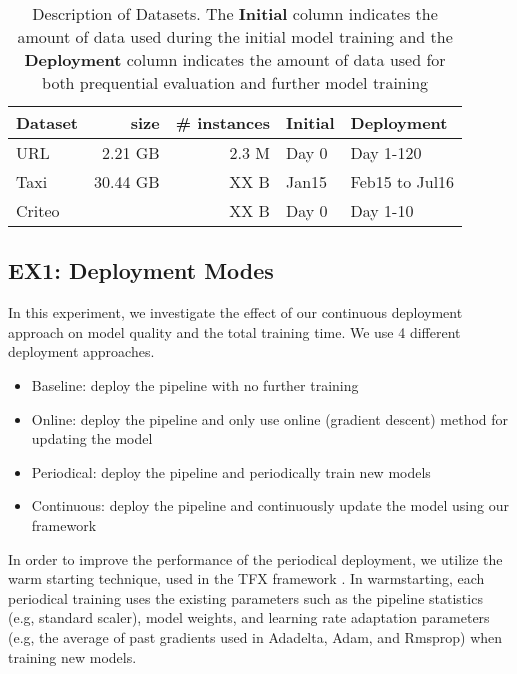 \begin{table}[h!]
\centering
\begin{tabular}{lrrll}
\hline
\textbf{Dataset}  & \textbf{size} &\textbf{\# instances} & \textbf{Initial} & \textbf{Deployment} \\
\hline
URL        &  2.21 GB & 2.3 M           & Day 0        & Day 1-120          \\
Taxi        & 30.44 GB & XX B              & Jan15             & Feb15 to Jul16    \\
Criteo       &  & XX B            & Day 0           & Day 1-10       \\
\hline
\end{tabular}
\caption{Description of Datasets. The \textbf{Initial} column indicates the amount of data used during the initial model training and the \textbf{Deployment} column indicates the amount of data used for both prequential evaluation and further model training}  
\label{dataset-description}
\end{table}


\subsection{EX1: Deployment Modes}
In this experiment, we investigate the effect of our continuous deployment approach on model quality and the total training time.
We use 4 different deployment approaches.
\begin{itemize}
\item Baseline: deploy the pipeline with no further training
\item Online: deploy the pipeline and only use online (gradient descent) method for updating the model
\item Periodical: deploy the pipeline and periodically train new models 
\item Continuous: deploy the pipeline and continuously update the model using our framework
\end{itemize}

In order to improve the performance of the periodical deployment, we utilize the warm starting technique, used in the TFX framework \cite{baylor2017tfx}.
In warmstarting, each periodical training uses the existing parameters such as the pipeline statistics (e.g, standard scaler), model weights, and learning rate adaptation parameters (e.g, the average of past gradients used in Adadelta, Adam, and Rmsprop) when training new models.

